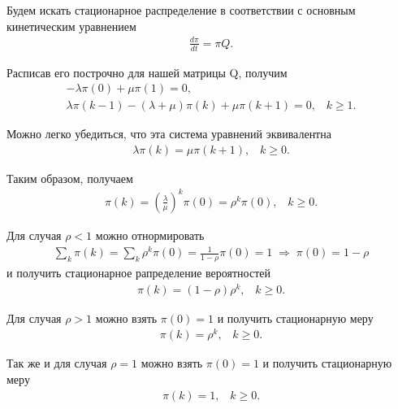 \documentclass[10pt]{article}
\begin{document}
Будем искать стационарное распределение в соответствии с основным кинетическим уравнением
\begin{gather*}
  \frac{d \pi}{d t} = \pi Q.
\end{gather*}

Расписав его построчно для нашей матрицы Q, получим
\begin{gather*}
  -\lambda \pi(0) + \mu \pi(1) = 0, \\
  \lambda \pi (k - 1) - (\lambda + \mu) \pi(k) + \mu \pi(k + 1) = 0, \;\;\; k \geq 1.
\end{gather*}

Можно легко убедиться, что эта система уравнений эквивалентна
\begin{gather*}
  \lambda \pi(k) = \mu \pi(k + 1), \;\;\; k \geq 0.
\end{gather*}

Таким образом, получаем
\begin{gather*}
  \pi(k) = \left( \frac{\lambda}{\mu} \right)^k \pi(0) = \rho^k \pi(0), \;\;\; k \geq 0.
\end{gather*}

Для случая $\rho < 1$ можно отнормировать
\begin{gather*}
  \sum\limits_k \pi(k) = \sum\limits_k \rho^k \pi(0) = \frac{1}{1 - \rho} \pi(0) = 1 \; \Rightarrow  \; \pi(0) = 1 - \rho
\end{gather*}
и получить стационарное рапределение вероятностей
\begin{gather*}
  \pi(k) = (1 - \rho) \rho^k, \;\;\; k \geq 0.
\end{gather*}

Для случая $\rho > 1$ можно взять $\pi(0) = 1$ и получить стационарную меру
\begin{gather*}
  \pi(k) = \rho^k, \;\;\; k \geq 0.
\end{gather*}

Так же и для случая $\rho = 1$ можно взять $\pi(0) = 1$ и получить стационарную меру
\begin{gather*}
  \pi(k) = 1, \;\;\; k \geq 0.
\end{gather*}
\end{document}

